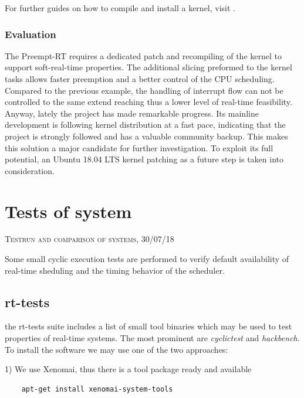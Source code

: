 \documentclass[]{scrartcl}
\begin{document}

For further guides on how to compile and install a kernel, visit \cite{misc01}.

\subsubsection{Evaluation}

The Preempt-RT requires a dedicated patch and recompiling of the kernel to support soft-real-time properties. The additional slicing preformed to the kernel tasks allows faster preemption and a better control of the CPU scheduling. Compared to the previous example, the handling of interrupt flow can not be controlled to the same extend reaching thus a lower level of real-time feasibility. Anyway, lately the project has made remarkable progress.
Its mainline development is following kernel distribution at a fast pace, indicating that the project is strongly followed and has a valuable community backup. This makes this solution a major candidate for further investigation.
To exploit its full potential, an Ubuntu 18.04 LTS kernel patching as a future step is taken into consideration.

\section{Tests of system}

{\small\textsc{Testrun and comparison of systems, 30/07/18} \bigskip}

Some small cyclic execution tests are performed to verify default availability of real-time sheduling and the timing behavior of the scheduler.

\subsection{rt-tests}

the rt-tests suite includes a list of small tool binaries which may be used to test properties of real-time systems. The most prominent are \textit{cyclictest} and \textit{hackbench}. To install the software we may use one of the two approaches:

1) We use Xenomai, thus there is a tool package ready and available

\begin{verbatim}
	apt-get install xenomai-system-tools
\end{verbatim}
\end{document}
